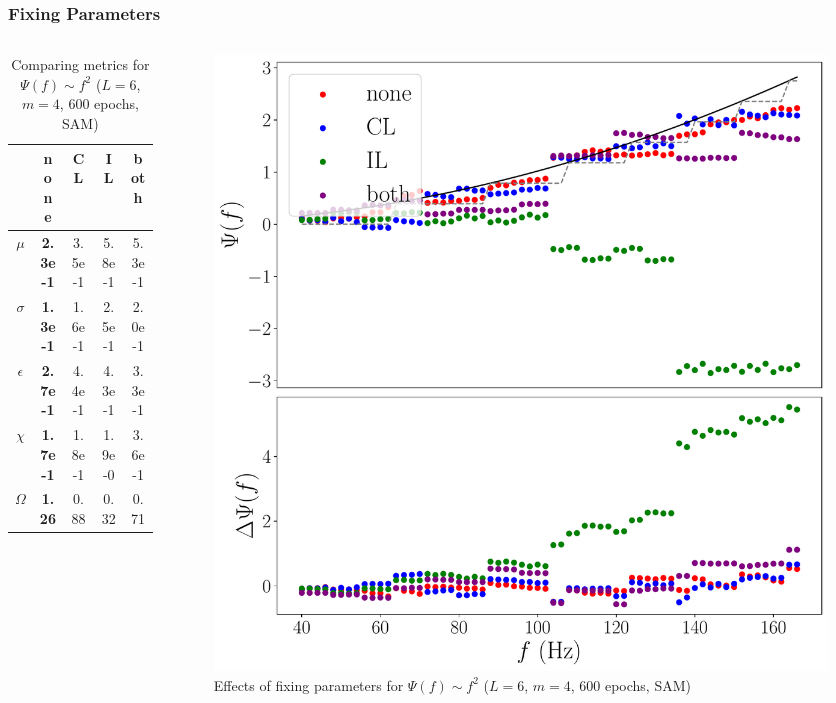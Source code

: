 \documentclass{beamer}
\begin{document}
\begin{frame}
\frametitle{Fixing Parameters}
\begin{columns}
\begin{column}{0.52\textwidth}
\begin{table}
\begin{tabular}{c || c| c | c| c }
&none & CL & IL & both \\ \hline \hline 
$\mu$ & \textbf{2.3e-1} & 3.5e-1 & 5.8e-1 & 5.3e-1   \\
$\sigma$ & \textbf{1.3e-1} & 1.6e-1 & 2.5e-1 & 2.0e-1  \\
$\epsilon$  &\textbf{ 2.7e-1} & 4.4e-1 & 4.3e-1 & 3.3e-1 \\
$\chi$ & \textbf{1.7e-1} & 1.8e-1 & 1.9e-0 & 3.6e-1 \\ \hline 
$\Omega$ & \textbf{1.26} & 0.88 & 0.32 & 0.71
\end{tabular}
\caption{Comparing metrics for $\Psi(f) \sim f^2$ ($L=6$, $m=4$, 600 epochs, SAM)}
\end{table}
\end{column}
\begin{column}{0.48\textwidth}
\begin{figure}
\centering 
\includegraphics[width=\textwidth]{im/phase_RP_comp_quadratic_m4}
\caption{Effects of fixing parameters for $\Psi(f) \sim f^2$ ($L=6$, $m=4$, 600 epochs, SAM)}
\end{figure}
\end{column}
\end{columns}
\end{frame}
\end{document}
